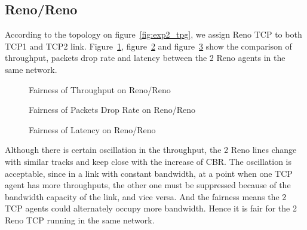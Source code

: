 \documentclass[10pt, conference]{lib/IEEEtran}
\begin{document}
\subsection{Reno/Reno}
According to the topology on figure~\ref{fig:exp2_tpg}, we assign Reno TCP to both TCP1 and TCP2 link. 
Figure~\ref{fig:exp2_thp_rr}, figure~\ref{fig:exp2_dr_rr} and figure~\ref{fig:exp2_lt_rr} show the comparison of 
throughput, packets drop rate and latency between the 2 Reno agents in the same network.
\vspace{-0.2in}
\begin{figure}[H]
    \centering
    \resizebox{0.9\linewidth}{!}{}
    \caption{Fairness of Throughput on Reno/Reno}
    \label{fig:exp2_thp_rr}
\end{figure}
\vspace{-0.3in}
\begin{figure}[H]
    \centering
    \resizebox{0.9\linewidth}{!}{}
    \caption{Fairness of Packets Drop Rate on Reno/Reno}
    \label{fig:exp2_dr_rr}
\end{figure}
\vspace{-0.3in}
\begin{figure}[H]
    \centering
    \resizebox{0.9\linewidth}{!}{}
    \caption{Fairness of Latency on Reno/Reno}
    \label{fig:exp2_lt_rr}
\end{figure}
Although there is certain oscillation in the throughput, the 2 Reno lines change with similar tracks and keep close 
with the increase of CBR. The oscillation is acceptable, since in a link with constant bandwidth, at a point when 
one TCP agent has more throughputs, the other one must be suppressed because of the bandwidth capacity of the link, 
and vice versa. And the fairness means the 2 TCP agents could alternately occupy more bandwidth. Hence it is fair for 
the 2 Reno TCP running in the same network.
\end{document}
